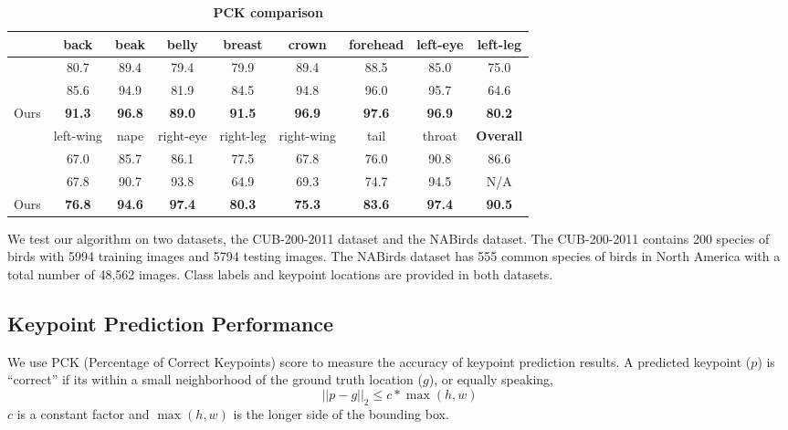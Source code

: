 \begin{table*}[h]
\centering
\caption{\textbf{PCK comparison} }
\label{pck-table}
\begin{tabular}{l | c | c | c | c | c | c | c | c }
\hline
& back & beak & belly & breast & crown & forehead & left-eye & left-leg\\
\hline
\hline
\cite{HuangXTZ_CVPR2016} & 80.7 & 89.4 & 79.4 & 79.9 & 89.4 & 88.5 & 85.0 & 75.0 \\
\hline
\cite{ZhangSGD_ICLRWorkshop2016} & 85.6 & 94.9 &81.9 & 84.5 & 94.8 & 96.0 & 95.7 & 64.6 \\
\hline
Ours  & \bf{91.3} & \bf{96.8} & \bf{89.0} & \bf{91.5} & \bf{96.9} & \bf{97.6} & \bf{96.9} & \bf{80.2}\\
\hline
& left-wing & nape & right-eye & right-leg & right-wing & tail & throat & \textbf{Overall} \\
\hline
\cite{HuangXTZ_CVPR2016} & 67.0 & 85.7 & 86.1 & 77.5 & 67.8 & 76.0 & 90.8 & 86.6\\
\hline
\cite{ZhangSGD_ICLRWorkshop2016} &  67.8 & 90.7 & 93.8 & 64.9 & 69.3 & 74.7 & 94.5 & N/A\\
\hline
Ours & \bf{76.8} & \bf{94.6} & \bf{97.4} & \bf{80.3} & \bf{75.3} & \bf{83.6} & \bf{97.4} & \bf{90.5}\\
\hline
\hline
\end{tabular}
\end{table*}











We test our algorithm on two datasets, the CUB-200-2011 dataset and the NABirds dataset.
The CUB-200-2011 contains 200 species of birds with 5994 training images and 5794 testing images. 
The NABirds dataset has 555 common species of birds in North America with a total number of 48,562 images.
Class labels and keypoint locations are provided in both datasets.



\subsection{Keypoint Prediction Performance}

We use PCK (Percentage of Correct Keypoints) score to measure the accuracy of keypoint prediction results.
A predicted keypoint ($p$) is ``correct'' if its within a small neighborhood of the ground truth location ($g$), or equally speaking,  
$$||p - g||_2 \le c * \max(h, w)$$ 
$c$ is a constant factor and $\max(h,w)$ is the longer side of the bounding box.

